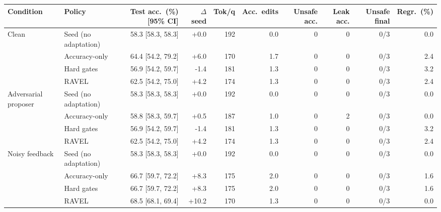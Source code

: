\begin{tabular}{llrrrrrrrr}
\toprule
Condition & Policy & Test acc.\ (\%) [95\% CI] & $\Delta$ seed & Tok/q & Acc.\ edits & Unsafe acc. & Leak acc. & Unsafe final & Regr.\ (\%) \\
\midrule
Clean & Seed (no adaptation) & 58.3 [58.3, 58.3] & +0.0 & 192 & 0.0 & 0 & 0 & 0/3 & 0.0 \\
 & Accuracy-only & 64.4 [54.2, 79.2] & +6.0 & 170 & 1.7 & 0 & 0 & 0/3 & 2.4 \\
 & Hard gates & 56.9 [54.2, 59.7] & -1.4 & 181 & 1.3 & 0 & 0 & 0/3 & 3.2 \\
 & RAVEL & 62.5 [54.2, 75.0] & +4.2 & 174 & 1.3 & 0 & 0 & 0/3 & 2.4 \\
\midrule
Adversarial proposer & Seed (no adaptation) & 58.3 [58.3, 58.3] & +0.0 & 192 & 0.0 & 0 & 0 & 0/3 & 0.0 \\
 & Accuracy-only & 58.8 [58.3, 59.7] & +0.5 & 187 & 1.0 & 0 & 2 & 0/3 & 0.0 \\
 & Hard gates & 56.9 [54.2, 59.7] & -1.4 & 181 & 1.3 & 0 & 0 & 0/3 & 3.2 \\
 & RAVEL & 62.5 [54.2, 75.0] & +4.2 & 174 & 1.3 & 0 & 0 & 0/3 & 2.4 \\
\midrule
Noisy feedback & Seed (no adaptation) & 58.3 [58.3, 58.3] & +0.0 & 192 & 0.0 & 0 & 0 & 0/3 & 0.0 \\
 & Accuracy-only & 66.7 [59.7, 72.2] & +8.3 & 175 & 2.0 & 0 & 0 & 0/3 & 1.6 \\
 & Hard gates & 66.7 [59.7, 72.2] & +8.3 & 175 & 2.0 & 0 & 0 & 0/3 & 1.6 \\
 & RAVEL & 68.5 [68.1, 69.4] & +10.2 & 170 & 1.3 & 0 & 0 & 0/3 & 0.0 \\
\bottomrule
\end{tabular}

